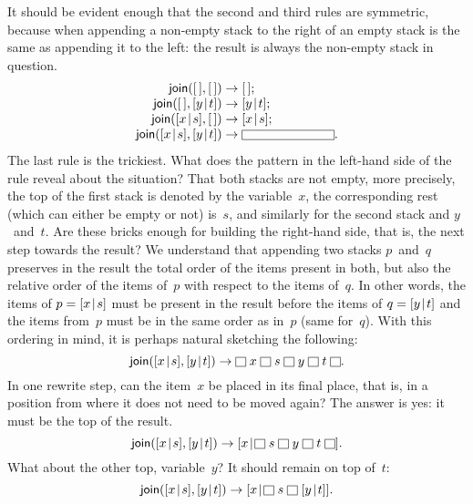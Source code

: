 It should be evident enough that the second and third rules are
symmetric, because when appending a non\hyp{}empty stack to the right
of an empty stack is the same as appending it to the left: the result
is always the non\hyp{}empty stack in question.
\begin{equation*}
\begin{array}{r@{\;}l@{\;}l}
\fun{join}(\el,\el) & \rightarrow & \el;\\
\fun{join}(\el,\cons{y}{t}) & \rightarrow & \cons{y}{t};\\
\fun{join}(\cons{x}{s},\el) & \rightarrow & \cons{x}{s};\\
\fun{join}(\cons{x}{s},\cons{y}{t}) & \rightarrow & \fbcode{CCCCCCCCCC}.
\end{array}
\end{equation*}
The last rule is the trickiest. What does the pattern in the
left\hyp{}hand side of the rule reveal about the situation? That both
stacks are not empty, more precisely, the top of the first stack is
denoted by the variable~\(x\), the corresponding rest (which can
either be empty or not) is~\(s\), and similarly for the second stack
and \(y\)~and~\(t\). Are these bricks enough for building the
right\hyp{}hand side, that is, the next step towards the result? We
understand that appending two stacks \(p\)~and~\(q\) preserves in the
result the total order of the items present in both, but also the
relative order of the items of~\(p\) with respect to the items
of~\(q\). In other words, the items of \(p=[{x}\!\mid\!{s}]\) must be
present in the result before the items of \(q=[{y}\!\mid\!{t}]\) and the
items from~\(p\) must be in the same order as in~\(p\) (same
for~\(q\)). With this ordering in mind, it is perhaps natural
sketching the following:
\begin{equation*}
\fun{join}(\cons{x}{s},\cons{y}{t}) \rightarrow \fbcode{II} \; x \;
\fbcode{II} \; s \; \fbcode{II} \; y \; \fbcode{II} \; t \; \fbcode{II}.
\end{equation*}
In one rewrite step, can the item~\(x\) be placed in its final place,
that is, in a position from where it does not need to be moved again?
The answer is yes: it must be the top of the result.
\begin{equation*}
\fun{join}(\cons{x}{s},\cons{y}{t}) \rightarrow \cons{x}{\fbcode{II}
  \; s \; \fbcode{II} \; y \; \fbcode{II} \; t \; \fbcode{II}}.
\end{equation*}
What about the other top, variable~\(y\)? It should remain on
top of~\(t\):
\begin{equation*}
\fun{join}(\cons{x}{s},\cons{y}{t}) \rightarrow \cons{x}{\fbcode{II}
  \; s \; \fbcode{II} \; \cons{y}{t}}.
\end{equation*}
